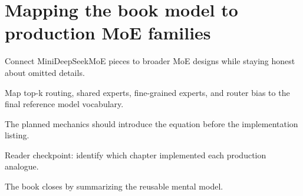 \section{Mapping the book model to production MoE families}
\label{sec:ch12-mapping-the-book-model-to-production-moe-families}

Connect MiniDeepSeekMoE pieces to broader MoE designs while staying honest about omitted details.



Map top-k routing, shared experts, fine-grained experts, and router bias to the final reference model vocabulary.



The planned mechanics should introduce the equation before the implementation listing.





\begin{checkpointbox}
Reader checkpoint: identify which chapter implemented each production analogue.
\end{checkpointbox}

The book closes by summarizing the reusable mental model.

